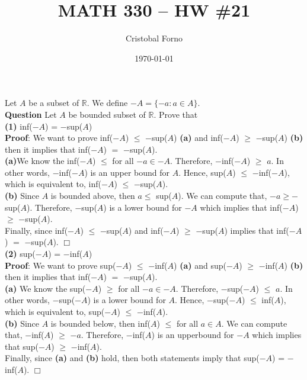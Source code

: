 \documentclass[12pt]{article}
\title{MATH 330 -- HW \#21}
\author{Cristobal Forno}
\date{\today}
\begin{document}
\maketitle

\noindent
Let $A$ be a subset of $\mathbb{R}$. We define $-A = \{-a : a \in A\}$.\\
\noindent
\textbf{Question} Let $A$ be bounded subset of $\mathbb{R}$. Prove that \\
\textbf{(1)} inf($-A$) = $-$sup($A$)\\
\indent
\textbf{Proof}: We want to prove inf($-A$) $\leq$ $-$sup($A$) \textbf{(a)} and inf($-A$)
$\geq$ $-$sup($A$) \textbf{(b)} then it implies that inf($-A$) $=$ $-$sup($A$). \\
\indent \indent
\textbf{(a)}We know the inf($-A$) $\leq$ for all $-a \in -A$. Therefore,
$-$inf($-A$) $\geq$ $a$. In other words, $-$inf($-A$) is an upper bound for $A$.
Hence, sup($A$) $\leq$ $-$inf($-A$), which is equivalent to, inf($-A$) $\leq$
$-$sup($A$).\\
\indent \indent
\textbf{(b)} Since $A$ is bounded above, then $a \leq$ sup($A$). We can compute
that, $-a \geq -$sup($A$). Therefore, $-$sup($A$) is a lower bound for $-A$ which implies that
inf($-A$) $\geq$ $-$sup($A$).\\
\indent
Finally, since inf($-A$) $\leq$ $-$sup($A$)  and inf($-A$)
$\geq$ $-$sup($A$) implies that inf($-A$) $=$ $-$sup($A$). $\Box$\\

\textbf{(2)} sup($-A$) = $-$inf($A$) \\
\indent
\textbf{Proof}: We want to prove sup($-A$) $\leq$ $-$inf($A$) \textbf{(a)} and sup($-A$)
$\geq$ $-$inf($A$) \textbf{(b)} then it implies that inf($-A$) $=$ $-$sup($A$). \\
\indent \indent
\textbf{(a)} We know the sup($-A$) $\geq$ for all $-a \in -A$. Therefore,
$-$sup($-A$) $\leq$ $a$. In other words, $-$sup($-A$) is a lower bound for $A$.
Hence, $-$sup($-A$) $\leq$ inf($A$), which is equivalent to, sup($-A$) $\leq$
$-$inf($A$).\\
\indent \indent
\textbf{(b)} Since $A$ is bounded below, then inf($A$) $\leq$ for all $a \in A$.
We can compute that, $-$inf($A$) $\geq$ $-a$. Therefore, $-$inf($A$) is an
upperbound for $-A$ which implies that sup($-A$) $\geq$ $-$inf($A$).\\
\indent
Finally, since \textbf{(a)} and \textbf{(b)} hold, then both statements imply that sup($-A$) = $-$inf($A$). $\Box$
\end{document}

